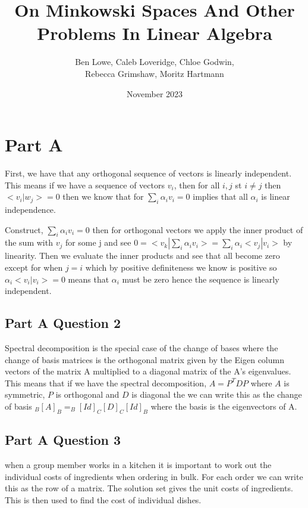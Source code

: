 \documentclass{article}
\title{On Minkowski Spaces And Other Problems In Linear Algebra}
\author{Ben Lowe, Caleb Loveridge, Chloe Godwin, \\ Rebecca Grimshaw, Moritz Hartmann }
\date{November 2023}
\begin{document}
\maketitle

\tableofcontents

\break 

\section{Part A}
First, we have that any orthogonal sequence of vectors is linearly independent. This means if we have a sequence of vectors $v_i$, then for all $i,j$ st $i \neq j$ then $<v_i|w_j> = 0$ then we know that for $\sum_i \alpha_i v_i = 0$ implies that all $\alpha_i$ is linear independence.

Construct, $\sum_i \alpha_i v_i = 0$ then for orthogonal vectors we apply the inner product of the sum with $v_j$ for some j and see $0 = <v_k | \sum_i \alpha_i v_i> = \sum_i \alpha_i <v_j|v_i>$ by linearity. Then we evaluate the inner products and see that all become zero except for when $j=i$ which by positive definiteness we know is positive so $\alpha_i <v_i|v_i> = 0$ means that $\alpha_i$ must be zero hence the sequence is linearly independent. 

\subsection*{Part A Question 2}
Spectral decomposition is the special case of the change of bases where the change of basis matrices is the orthogonal matrix given by the Eigen column vectors of the matrix A  multiplied to a diagonal matrix of the A's eigenvalues. This means that if we have the spectral decomposition, $A = P^T D P$ where $A$ is symmetric, $P$ is orthogonal and $D$ is diagonal the we can write this as the change of basis $ _B[A]_B = _B[Id]_C[D]_C[Id]_B$ where the basis is the eigenvectors of A.

\subsection*{Part A Question 3}
when a group member works in a kitchen it is important to work out the individual costs of ingredients when ordering in bulk. For each order we can write this as the row of a matrix. The solution set gives the unit costs of ingredients. This is then used to find the cost of individual dishes.
\end{document}
